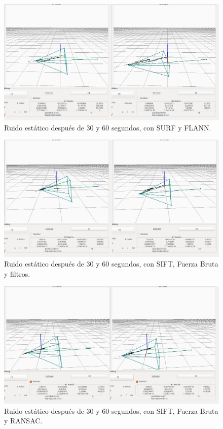 \begin{figure}[th]
\centering
\includegraphics[scale=0.3]{Figures/tests/static-surf-flann_2.png}
\decoRule
\caption[Ruido estático, con SURF y FLANN]{Ruido estático después de 30 y 60 segundos, con SURF y FLANN.}
\label{fig:static1}
\end{figure}

\begin{figure}[th]
\centering
\includegraphics[scale=0.3]{Figures/tests/static-filter_2.png}
\decoRule
\caption[Ruido estático, con SIFT, Fuerza Bruta y filtros]{Ruido estático después de 30 y 60 segundos, con SIFT, Fuerza Bruta y filtros.}
\label{fig:static2}
\end{figure}

\begin{figure}[th]
\centering
\includegraphics[scale=0.3]{Figures/tests/static-ransac_2.png}
\decoRule
\caption[Ruido estático, con SIFT, Fuerza Bruta y RANSAC]{Ruido estático después de 30 y 60 segundos, con SIFT, Fuerza Bruta y RANSAC.}
\label{fig:static3}
\end{figure}

